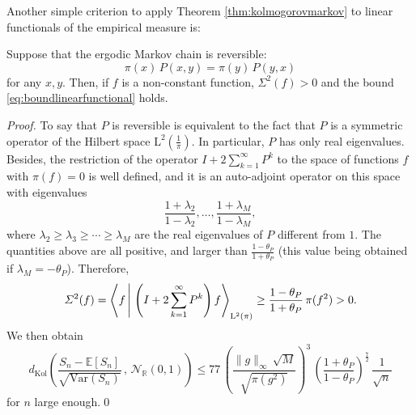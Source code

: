 \documentclass[envcountsame]{svmult}
\newcommand{\R}{\mathbb{R}}
\newcommand{\esper}{\mathbb{E}}
\newcommand{\leb}{\mathrm{L}}
\newcommand{\dkol}{d_\mathrm{Kol}}
\newcommand{\var}{\mathrm{Var}}
\newcommand{\gauss}{\mathcal{N}_{\R}(0,1)}
\newcommand{\scal}[2]{\left\langle #1\vphantom{#2}\,\right |\left.#2 \vphantom{#1}\right\rangle}
\begin{document}
Another simple criterion to apply Theorem \ref{thm:kolmogorovmarkov} to linear functionals of the empirical measure is:
\begin{proposition}
Suppose that the ergodic Markov chain is reversible: $$\pi(x)\,P(x,y) = \pi(y)\,P(y,x)$$ for any $x,y$. Then, if $f$ is a non-constant function, $\varSigma^2(f)>0$ and the bound \eqref{eq:boundlinearfunctional} holds.
\end{proposition}
\begin{proof}
To say that $P$ is reversible is equivalent to the fact that $P$ is a symmetric operator of the Hilbert space $\leb^2(\frac{1}{\pi})$. In particular, $P$ has only real eigenvalues. Besides, the restriction of the operator $I+2\sum_{k=1}^\infty P^k$ to the space of functions $f$ with $\pi(f)=0$ is well defined, and it is an auto-adjoint operator on this space with eigenvalues $$\frac{1+\lambda_2}{1-\lambda_2},\ldots,\frac{1+\lambda_M}{1-\lambda_M},$$ 
where $\lambda_2 \geq \lambda_3 \geq \cdots \geq \lambda_M$ are the real eigenvalues of $P$ different from $1$. The quantities above are all positive, and larger than $\frac{1-\theta_P}{1+\theta_P}$ (this value being obtained if $\lambda_M = - \theta_P$). Therefore,
\begin{equation*}
\varSigma^2(f) =  \scal{f}{\left(I+2\sum_{k=1}^\infty P^k\right) f}_{\leb^2(\pi)} \geq \frac{1-\theta_P}{1+\theta_P}\,\pi(f^2) > 0. 
\end{equation*}
We then obtain
$$\dkol\left(\frac{S_n- \esper[S_n]}{\sqrt{\var(S_n)}}\,,\,\gauss\right) \leq 77\,\left(\frac{\|g\|_\infty\,\sqrt{M}}{\sqrt{\pi(g^2)}}\right)^{\!3}\,\left(\frac{1+\theta_P}{1-\theta_P}\right)^{\!\frac{7}{2}}\,\frac{1}{\sqrt{n}}$$
for $n$ large enough.\qed
\end{proof}
\end{document}
